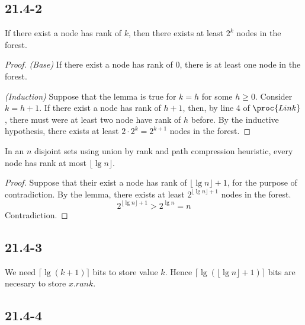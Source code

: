 \subsection*{21.4-2}

\begin{lemma}
    If there exist a node has rank of $k$,
    then there exists at least $2^k$ nodes in the forest.
\end{lemma}

\begin{proof}
    \textit{(Base)}
    If there exist a node has rank of $0$, 
    there is at least one node in the forest.

    \textit{(Induction)}
    Suppose that the lemma is true for $k = h$ for some $h \geq 0$.
    Consider $k = h + 1$.
    If there exist a node has rank of $h + 1$,
    then, by line 4 of $\proc{Link}$, 
    there must were at least two node have rank of $h$ before.
    By the inductive hypothesis, 
    there exists at least $2 \cdot 2^k = 2^{k+1}$ nodes in the forest.
\end{proof}

\begin{claim}
    In an $n$ disjoint sets using union by rank and path compression heuristic, 
    every node has rank at most $\lfloor \lg n \rfloor$.
\end{claim}

\begin{proof}
    Suppose that their exist a node has rank of $\lfloor \lg n \rfloor + 1$,
    for the purpose of contradiction.
    By the lemma, there exists at least $2^{\lfloor \lg n \rfloor + 1}$ nodes
    in the forest.
    \begin{equation*}
        2^{\lfloor \lg n \rfloor + 1} > 2^{\lg n} = n
    \end{equation*}
    Contradiction.
\end{proof}

\subsection*{21.4-3}

We need $\lceil \lg (k + 1) \rceil$ bits to store value $k$.
Hence $\lceil \lg (\lfloor \lg n \rfloor + 1) \rceil$ bits
are necesary to store $x.rank$. 

\subsection*{21.4-4}

